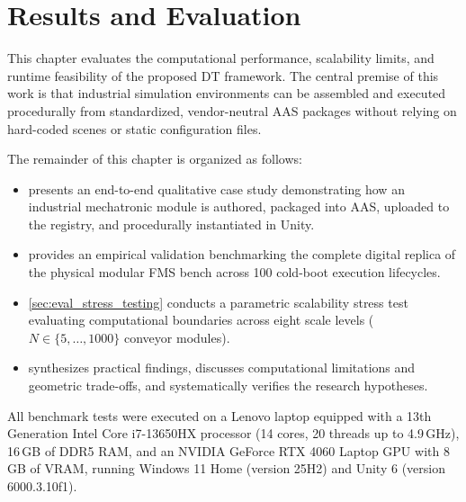 
%

\chapter{Results and Evaluation}
\label{cha:discussion}

This chapter evaluates the computational performance, scalability limits, and runtime feasibility of the proposed \gls{DT} framework. The central premise of this work is that industrial simulation environments can be assembled and executed procedurally from standardized, vendor-neutral \gls{AAS} packages without relying on hard-coded scenes or static configuration files.

The remainder of this chapter is organized as follows:
\begin{itemize}
    \item {} presents an end-to-end qualitative case study demonstrating how an industrial mechatronic module is authored, packaged into \gls{AAS}, uploaded to the registry, and procedurally instantiated in Unity.
    \item {} provides an empirical validation benchmarking the complete digital replica of the physical modular \gls{FMS} bench across 100 cold-boot execution lifecycles.
    \item \cref{sec:eval_stress_testing} conducts a parametric scalability stress test evaluating computational boundaries across eight scale levels ($N \in \{5, \dots, 1000\}$ conveyor modules).
    \item {} synthesizes practical findings, discusses computational limitations and geometric trade-offs, and systematically verifies the research hypotheses.
\end{itemize}

All benchmark tests were executed on a Lenovo laptop equipped with a 13th Generation Intel Core i7-13650HX processor (14 cores, 20 threads up to 4.9\,GHz), 16\,GB of DDR5 \gls{RAM}, and an NVIDIA GeForce RTX 4060 Laptop \gls{GPU} with 8\,GB of \gls{VRAM}, running Windows 11 Home (version 25H2) and Unity 6 (version 6000.3.10f1).


